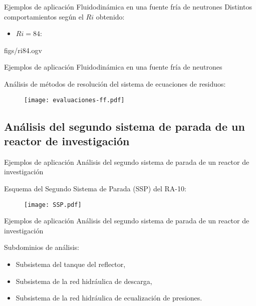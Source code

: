 \begin{frame}
{Ejemplos de aplicación}
{Fluidodinámica en una fuente fría de neutrones}
Distintos comportamientos según el $Ri$ obtenido:
\begin{itemize}
\item $Ri=84$:
\end {itemize}

\begin{center}
%
{figs/ri84.ogv} %
\end{center}

\end{frame}







\begin{frame}
{Ejemplos de aplicación}
{Fluidodinámica en una fuente fría de neutrones}

Análisis de métodos de resolución del sistema de ecuaciones de residuos:

\begin{figure}
\centering{}
\texttt{[image: evaluaciones-ff.pdf]}
\end{figure}

\end{frame}












\subsection{Análisis del segundo sistema de parada de un reactor de investigación}

\begin{frame}
{Ejemplos de aplicación}
{Análisis del segundo sistema de parada de un reactor de investigación}

Esquema del Segundo Sistema de Parada (SSP) del RA-10:

\begin{figure}
\centering{}
\texttt{[image: SSP.pdf]}
\end{figure}

\end{frame}

\begin{frame}
{Ejemplos de aplicación}
{Análisis del segundo sistema de parada de un reactor de investigación}

Subdominios de análisis:

\begin{itemize}
\item <2-> Subsistema del tanque del reflector,
\item <3-> Subsistema de la red hidráulica de descarga,
\item <4-> Subsistema de la red hidráulica de ecualización de presiones.
\end{itemize}

\end{frame}

